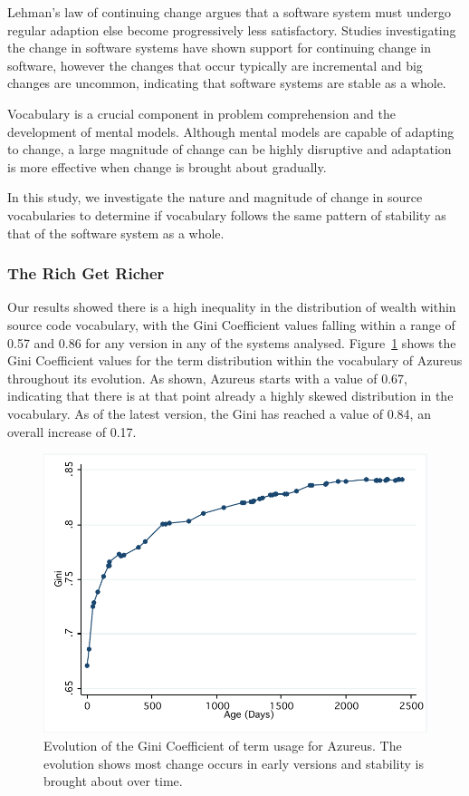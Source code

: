 Lehman's law of continuing change argues that a software system must undergo regular adaption else become progressively less satisfactory. Studies investigating the change in software systems have shown support for continuing change in software, however the changes that occur typically are incremental and big changes are uncommon, indicating that software systems are stable as a whole.

Vocabulary is a crucial component in problem comprehension and the development of mental models. Although mental models are capable of adapting to change, a large magnitude of change can be highly disruptive and adaptation is more effective when change is brought about gradually.

In this study, we investigate the nature and magnitude of change in source vocabularies to determine if vocabulary follows the same pattern of stability as that of the software system as a whole.

\subsubsection{The Rich Get Richer} %
\label{sub:the_rich_get_richer}

Our results showed there is a high inequality in the distribution of wealth within source code vocabulary, with the Gini Coefficient values falling within a range of 0.57 and 0.86 for any version in any of the systems analysed. Figure~\ref{fig:vocab-gini-azureus} shows the Gini Coefficient values for the term distribution within the vocabulary of Azureus throughout its evolution. As shown, Azureus starts with a value of 0.67, indicating that there is at that point already a highly skewed distribution in the vocabulary. As of the latest version, the Gini has reached a value of 0.84, an overall increase of 0.17.

\begin{figure}[t]
\centering
\includegraphics[width=\textwidth]{Figures/Vocab-AzureusGini.pdf}
\caption{Evolution of the Gini Coefficient of term usage for Azureus. The evolution shows most change occurs in early versions and stability is brought about over time.}
\label{fig:vocab-gini-azureus}
\end{figure}

